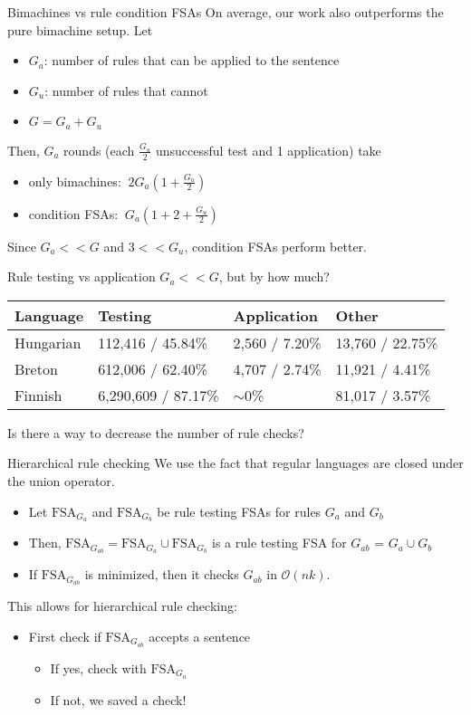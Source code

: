\documentclass[utf8x,t,aspectratio=169]{beamer}
\newcommand{\vitem}{\item \vspace{4pt}}
\begin{document}
\begin{frame}{Bimachines vs rule condition FSAs}
On average, our work also outperforms the pure bimachine setup. Let
\begin{itemize}
    \vitem $G_a$: number of rules that can be applied to the sentence
    \vitem $G_u$: number of rules that cannot
    \vitem $G = G_a + G_u$
\end{itemize}
Then, $G_a$ rounds (each $\frac{G_u}{2}$ unsuccessful test and 1 application) take
\begin{itemize}
    \vitem only bimachines: $~2G_a(1 + \frac{G_u}{2})$
    \vitem condition FSAs: $~G_a(1 + 2 + \frac{G_u}{2})$
\end{itemize}
Since $G_a << G$ and $3 << G_u$, condition FSAs perform better.
\end{frame}

\begin{frame}{Rule testing vs application}
$G_a << G$, but by how much?

\bigskip

\begin{tabular}{| l | l | l | l |}
\hline
\textbf{Language} & \textbf{Testing} & \textbf{Application} & \textbf{Other} \\
\hline
Hungarian & 112,416 / 45.84\% & 2,560 / 7.20\% & 13,760 / 22.75\% \\
Breton & 612,006 / 62.40\% & 4,707 / 2.74\% & 11,921 / 4.41\% \\
Finnish & 6,290,609 / 87.17\% & $\sim$0\% & 81,017 / 3.57\% \\
\hline
\end{tabular}

\bigskip

Is there a way to decrease the number of rule checks?

\end{frame}

\begin{frame}{Hierarchical rule checking}
We use the fact that regular languages are closed under the union operator.
\begin{itemize}
    \vitem Let $\mathrm{FSA}_{G_a}$ and $\mathrm{FSA}_{G_b}$ be rule testing FSAs
           for rules $G_a$ and $G_b$
    \vitem Then, $\mathrm{FSA}_{G_{ab}} = \mathrm{FSA}_{G_a} \cup \mathrm{FSA}_{G_b}$
           is a rule testing FSA for $G_{ab}$ = $G_a \cup G_b$
    \vitem If $\mathrm{FSA}_{G_{ab}}$ is minimized, then it checks $G_{ab}$ in
           $\mathcal{O}(nk)$.
\end{itemize}
This allows for hierarchical rule checking:
\begin{itemize}
    \vitem First check if $\mathrm{FSA}_{G_{ab}}$ accepts a sentence
    \begin{itemize}
        \vitem If yes, check with $\mathrm{FSA}_{G_a}$
        \vitem If not, we saved a check!
    \end{itemize}
\end{itemize}
\end{frame}
\end{document}

